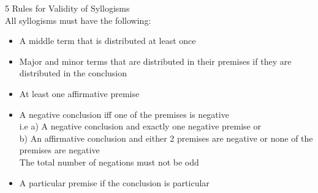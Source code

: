 5 Rules for Validity of Syllogisms\\
All syllogisms must have the following:
\begin{itemize}
    \item A middle term that is distributed at least once
    \item Major and minor terms that are distributed in their premises if they are distributed in the conclusion
    \item At least one affirmative premise
    \item A negative conclusion iff one of the premises is negative\\
    i.e a) A negative conclusion and exactly one negative premise or\\
    b) An affirmative conclusion and either 2 premises are negative or none of the premises are negative\\
    The total number of negations must not be odd
    \item A particular premise if the conclusion is particular
\end{itemize}